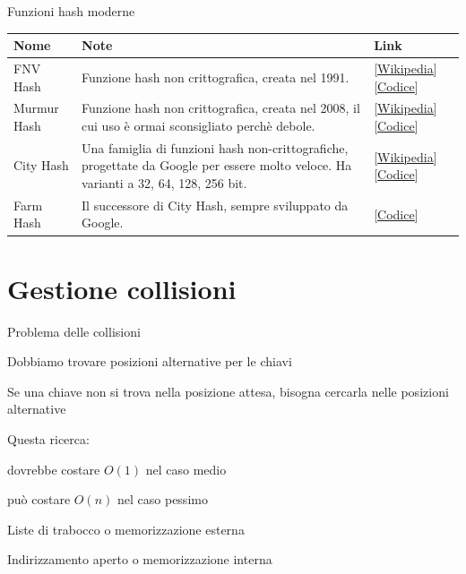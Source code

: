 \begin{frame}{Funzioni hash moderne}
	
{\renewcommand*{\arraystretch}{1.3}
\begin{tabular}{|P{2.5cm}|P{6cm}|P{2cm}|}
\hline
\textbf{Nome} & \textbf{Note} & \textbf{Link}
\\ \hline
FNV Hash & 
Funzione hash non crittografica, creata nel 1991.
&
[\href{https://en.wikipedia.org/wiki/Fowler-Noll-Vo_hash_function}{\alert{\underline{Wikipedia}}}]
[\href{http://isthe.com/chongo/tech/comp/fnv/}{\alert{\underline{Codice}}}]
\\ \hline
Murmur Hash &
Funzione hash non crittografica, creata nel 2008, il cui uso è ormai sconsigliato
perchè debole.
&
[\href{https://en.wikipedia.org/wiki/MurmurHash}{\alert{\underline{Wikipedia}}}]
[\href{https://github.com/aappleby/smhasher/}{\alert{\underline{Codice}}}]
\\ \hline
City Hash &
Una famiglia di funzioni hash non-crittografiche, progettate
da Google per essere molto veloce. Ha varianti a 32, 64, 128, 256 bit.
&
[\href{https://en.wikipedia.org/wiki/CityHash}{\alert{\underline{Wikipedia}}}]
[\href{https://github.com/google/cityhash/}{\alert{\underline{Codice}}}]
\\ \hline
Farm Hash &
Il successore di City Hash, sempre sviluppato da Google.
&
[\href{https://github.com/google/farmhash/}{\alert{\underline{Codice}}}]
\\ \hline
\end{tabular}
}
\end{frame}


\section{Gestione collisioni}


\begin{frame}{Problema delle collisioni}
	
\vspace{-6pt}
\BI
\item Dobbiamo trovare posizioni alternative per le chiavi
\item Se una chiave non si trova nella posizione attesa, bisogna cercarla nelle posizioni alternative
\item Questa ricerca:
  \BI
	\item dovrebbe costare $O(1)$ nel caso medio
	\item può costare $O(n)$ nel caso pessimo
	\EI
\EI

\BI
\item \alert{Liste di trabocco} o memorizzazione esterna
\item \alert{Indirizzamento aperto} o memorizzazione interna
\EI

\end{frame}

